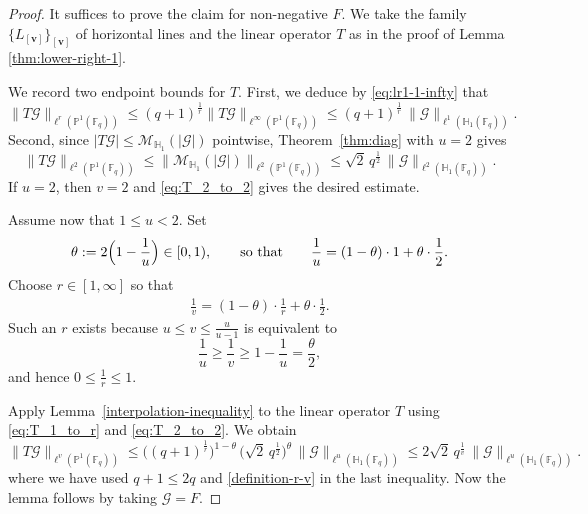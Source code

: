 \documentclass[11pt]{article}
\newcommand{\1}{\mathbf 1}
\begin{document}
\begin{proof}
It suffices to prove the claim for non-negative $F$. We take the family $\{L_{[\mathbf{v}]}\}_{[\mathbf{v}]}$ of horizontal lines and the linear operator $T$ as in the proof of Lemma \ref{thm:lower-right-1}.

We record two endpoint bounds for $T$. First, we deduce by \eqref{eq:lr1-1-infty} that 
\begin{equation}\label{eq:T_1_to_r}
\|T\mathcal{G}\|_{\ell^r(\mathbb{P}^1(\mathbb{F}_q))}\leq (q+1)^{\frac1r} \|T\mathcal{G}\|_{\ell^\infty( \mathbb{P}^1(\mathbb{F}_q))}
\le (q+1)^{\frac{1}{r}}\,\|\mathcal{G}\|_{\ell^1(\mathbb{H}_1(\mathbb{F}_q))}.
\end{equation}
Second, since $|T\mathcal{G}|\le \mathcal{M}_{\mathbb{H}_1}(|\mathcal{G}|)$ pointwise, Theorem~\ref{thm:diag} with $u=2$ gives
\begin{equation}\label{eq:T_2_to_2}
\|T\mathcal{G}\|_{\ell^2(\mathbb{P}^1(\mathbb{F}_q))}
\le \|\mathcal{M}_{\mathbb{H}_1}(|\mathcal{G}|)\|_{\ell^2(\mathbb{P}^1(\mathbb{F}_q))}
\le \sqrt{2}\, q^{\frac{1}{2}}\, \|\mathcal{G}\|_{\ell^2(\mathbb{H}_1(\mathbb{F}_q))}.
\end{equation}
If $u=2$, then $v=2$ and \eqref{eq:T_2_to_2} gives the desired estimate.

Assume now that $1\le u<2$. Set
\[
\theta := 2\Bigl(1-\frac1u\Bigr)\in[0,1),
\qquad\text{so that}\qquad
\frac1u=(1-\theta)\cdot 1 + \theta\cdot \frac12.
\]
Choose $r\in[1,\infty]$ so that
\begin{align}\label{definition-r-v}
    \frac1v = (1-\theta)\cdot \frac1r + \theta\cdot \frac12.
\end{align}
Such an $r$ exists because $u\le v\le \frac{u}{u-1}$ is equivalent to
\[
\frac1u \ge \frac1v \ge 1-\frac1u = \frac{\theta}{2},
\]
and hence $0\le \frac1r \le 1$.

Apply Lemma~\ref{interpolation-inequality} to the linear operator $T$ using \eqref{eq:T_1_to_r} and \eqref{eq:T_2_to_2}.
We obtain
\[
\|T\mathcal{G}\|_{\ell^v(\mathbb{P}^{1}(\mathbb{F}_q))}
\le
\bigl((q+1)^{\frac{1}{r}}\bigr)^{1-\theta}\,
\bigl(\sqrt{2}\,q^{\frac{1}{2}}\bigr)^{\theta}\,
\|\mathcal{G}\|_{\ell^u(\mathbb{H}_1(\mathbb{F}_q))} \leq 2\sqrt{2}\, q^{\frac{1}{v}}\, \|\mathcal{G}\|_{\ell^u(\mathbb{H}_1(\mathbb{F}_q))}.
\]
where we have used $q+1\leq 2q$ and
\eqref{definition-r-v} in the last inequality. Now the lemma follows by taking $\mathcal G=F$.
\end{proof}
\end{document}
